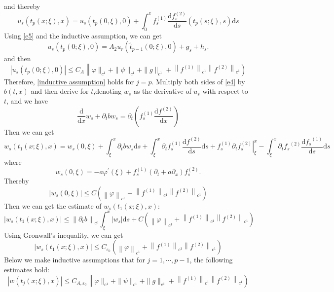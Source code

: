 \documentclass[a4paper,reqno,11pt]{amsart}
\numberwithin{equation}{section} %
\begin{document}
and thereby
$$
u_s\left( t_p\left( x;\xi \right) ,x \right) =u_s(t_p(0,\xi ),0)+\int_{0}^x{f_{s}^{(1)}\frac{\mathrm{d}f_{s}^{(2)}}{\mathrm{d}s}\left( t_p\left( s;\xi \right) ,s \right) \mathrm{d}s}
$$
Using \eqref{e5} and the inductive assumption, we can get
$$
u_s\left(t_p(0 ; \xi), 0\right)=A_2 u_r\left(\tilde{t}_{p-1}(0 ; \xi), 0\right)+g_s+h_s .
$$
and then
$$
\left| u_s\left( t_p(0;\xi ),0 \right) \right|\leqslant C_A\left\| \varphi \parallel _{c^1}+\parallel \psi \parallel _{c^1}+\parallel g\parallel _{c^1}+\left\| f^{(1)} \right\| _{c^1}\left\| f^{(2)} \right\| _{c^1} \right) 
$$
Therefore, \eqref{inductive assumption} holds for $j=p$.
Multiply both sides of \eqref{e4} by $b(t,x)$ and then derive for $t$,denoting $w_s$ as the derivative of $u_s$ with respect to $t$, and we have
$$
\frac{\mathrm{d}}{\mathrm{d}x}w_s+\partial _tbw_s=\partial _t\left( f_{s}^{(1)}\frac{\mathrm{d}f^{(2)}}{\mathrm{d}x} \right) 
$$
Then we can get
\begin{equation}\label{e of w_s 1}
w_s\left( t_1(x;\xi ),x \right) =w_s(0,\xi )+\int_{\xi}^x{\partial _tbw_s\mathrm{d}s}+\int_{\xi}^x{\partial _tf_{s}^{(1)}\frac{\mathrm{d}f^{(2)}}{\mathrm{d}s}\mathrm{d}s}+\left. f_{s}^{(1)}\partial _tf_{s}^{(2)} \right|_{\xi}^{x}-\int_{\xi}^x{\partial _t{f_s}^{(2)}\frac{\mathrm{d}{f_s}^{(1)}}{\mathrm{d}s}\mathrm{d}s}
\end{equation}
where
\begin{equation}\label{w_s at 0}
w_s(0, \xi)=-a \varphi^{\prime}(\xi)+f_s^{(1)}\left(\partial_t+a \partial_x\right) f_s^{(2)} .
\end{equation}
Thereby
$$
\left| w_s(0,\xi ) \right|\leqslant C\left( \left\| \varphi \right\| _{c^1}+\left\| f^{\left( 1 \right)} \right\| _{c^1}\left\| f^{(2)} \right\| _{c^1} \right) 
$$
Then we can get the estimate of $w_s\left( t_1(x;\xi ),x \right) $:
$$
\left| w_s\left( t_1(x;\xi ),x \right) \right|\leqslant \left\| \partial _tb \right\| _{c^0}\int_{\xi}^x{\left| w_s \right|\mathrm{d}s}+C\left( \left\| \varphi \right\| _{c^1}+\left\| f^{(1)} \right\| _{c^1}\left\| f^{(2)} \right\| _{c^1} \right) 
$$
Using Gronwall's inequality, we can get
$$
\left| w_s\left( t_1(x;\xi ),x \right) \right|\leqslant C_{\varepsilon _0}\left( \left\| \varphi \right\| _{c^1}+\left\| f^{(1)} \right\| _{c^1}\left\| f^{(2)} \right\| _{c^1} \right) 
$$
Below we make inductive assumptions that for $j=1,\cdots,p-1$, the following estimates hold:
\begin{equation}\label{inductive assumption for w}
\left| w\left( t_j(x;\xi ),x \right) \right|\leqslant C_{A,\varepsilon _0}\left\| \varphi \parallel _{c^1}+\parallel \psi \parallel _{c^1}+\parallel g\parallel _{c^1}+\left\| f^{(1)} \right\| _{c^1}\left\| f^{(2)} \right\| _{c^1} \right)
\end{equation}
\end{document}
